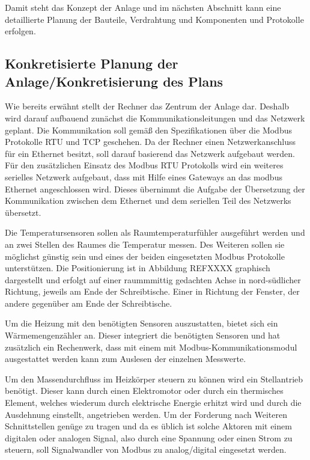 Damit steht das Konzept der Anlage und im nächsten Abschnitt kann eine detaillierte Planung der Bauteile, Verdrahtung und Komponenten und Protokolle erfolgen.

\subsection{Konkretisierte Planung der Anlage/Konkretisierung des Plans}

Wie bereits erwähnt stellt der Rechner das Zentrum der Anlage dar. Deshalb wird darauf aufbauend zunächst die Kommunikationsleitungen und das Netzwerk geplant. Die Kommunikation soll gemäß den Spezifikationen über die Modbus Protokolle RTU und TCP geschehen. Da der Rechner einen Netzwerkanschluss für ein Ethernet besitzt, soll darauf basierend das Netzwerk aufgebaut werden. Für den zusätzlichen Einsatz des Modbus RTU Protokolls wird ein weiteres serielles Netzwerk aufgebaut, dass mit Hilfe eines Gateways an das modbus Ethernet angeschlossen wird. Dieses übernimmt die Aufgabe der Übersetzung der Kommunikation zwischen dem Ethernet und dem seriellen Teil des Netzwerks übersetzt.

Die Temperatursensoren sollen als Raumtemperaturfühler ausgeführt werden und an zwei Stellen des Raumes die Temperatur messen. Des Weiteren sollen sie möglichst günstig sein und eines der beiden eingesetzten Modbus Protokolle unterstützen. Die Positionierung ist in Abbildung REFXXXX graphisch dargestellt und erfolgt auf einer raummmittig gedachten Achse in nord-südlicher Richtung, jeweils am Ende der Schreibtische. Einer in Richtung der Fenster, der andere gegenüber am Ende der Schreibtische.

Um die Heizung mit den benötigten Sensoren auszustatten, bietet sich ein Wärmemengenzähler an. Dieser integriert die benötigten Sensoren und hat zusätzlich ein Rechenwerk, dass mit einem mit Modbus-Kommunikationsmodul ausgestattet werden kann zum Auslesen der einzelnen Messwerte.


Um den Massendurchfluss im Heizkörper steuern zu können wird ein Stellantrieb benötigt. Dieser kann durch einen Elektromotor oder durch ein thermisches Element, welches wiederum durch elektrische Energie erhitzt wird und durch die Ausdehnung einstellt, angetrieben werden. Um der Forderung nach Weiteren Schnittstellen genüge zu tragen und da es üblich ist solche Aktoren mit einem digitalen oder analogen Signal, also durch eine Spannung oder einen Strom zu steuern, soll Signalwandler von Modbus zu analog/digital eingesetzt werden.

